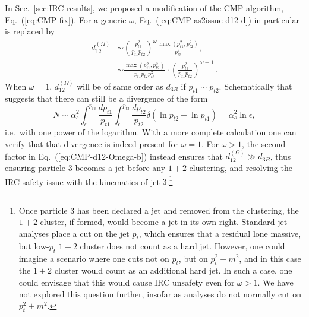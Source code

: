 \documentclass[nofootinbib,twocolumn,preprintnumbers,superscriptaddress,aps]{revtex4-2}
\newcommand{\as}{\alpha_s}
\newcommand{\logbook}[2]{}
\begin{document}
In Sec.~\ref{sec:IRC-results}, we proposed a modification of the
CMP algorithm, Eq.~(\ref{eq:CMP-fix}).
%
For a generic $\omega$, Eq.~(\ref{eq:CMP-as2issue-d12-d}) in
particular is replaced by
\begin{subequations}
  \label{eq:CMP-d12-Omega}
  \begin{align}
    d_{12}^{(\Omega)}
    &\sim \left(\frac{p_{t3}^2}{p_{t1}p_{t2}}\right)^{\omega}
      \frac{\max(p_{t1}^2,p_{t2}^2)}{p_{t3}^4},
    \\
  \label{eq:CMP-d12-Omega-b}
    &\sim
      \frac{\max(p_{t1}^2,p_{t2}^2)}{p_{t1} p_{t2} p_{t3}^2}
      \cdot \left(\frac{p_{t3}^2}{p_{t1}p_{t2}}\right)^{\omega-1}
      \,.
  \end{align}
\end{subequations}
When $\omega=1$, $d_{12}^{(\Omega)}$ will be of same order as $d_{3B}$
if $p_{t1} \sim p_{t2}$.
%
Schematically that suggests that there can still be a divergence of
the form
\begin{equation}
  N \sim \as^2
      \int^{p_{t3}}_\epsilon \frac{dp_{t1}}{p_{t1}}
      \int^{p_{t3}}_\epsilon \frac{dp_{t2}}{p_{t2}}
      \delta\left(\ln p_{t2}
      - \ln p_{t1}\right)
  = \as^2 \ln \epsilon,
  \label{eq:CMP-as2issue-failure-omega1}
\end{equation}
i.e.\ with one power of the logarithm.
%
With a more complete calculation one can verify that that divergence
is indeed present for $\omega=1$.
\logbook{}{see logbook/2023-04-CMP-IHCIHC.tex}%
%
For $\omega > 1$, the second factor in Eq.~(\ref{eq:CMP-d12-Omega-b})
instead ensures that $d_{12}^{(\Omega)} \gg d_{3B}$, thus ensuring
particle $3$ becomes a jet before any $1+2$ clustering, and resolving
the IRC safety issue with the kinematics of jet $3$.\footnote{%
  Once particle $3$ has been declared a jet and removed from the
  clustering, the $1+2$ cluster, if formed, would become a jet in its
  own right.
  Standard jet analyses place a cut on the jet $p_t$, which ensures
  that a residual lone massive, but low-$p_t$ $1+2$ cluster does not
  count as a hard jet.
  However, one could imagine a scenario where one cuts not on $p_t$, but on
  $p_t^2+m^2$, and in this case the $1+2$ cluster would count as an
  additional hard jet.
  In such a case, one could envisage that this would cause IRC
  unsafety even for $\omega>1$.
  We have not explored this question further, insofar as analyses do
  not normally cut on $p_t^2+m^2$.  }
\end{document}
